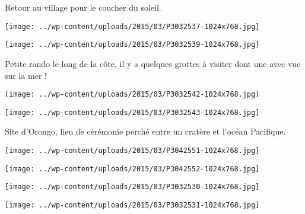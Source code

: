 Retour au village pour le coucher du soleil.
\begin{center} \texttt{[image: ../wp-content/uploads/2015/03/P3032537-1024x768.jpg]} \end{center}
\begin{center} \texttt{[image: ../wp-content/uploads/2015/03/P3032539-1024x768.jpg]} \end{center}

 Petite rando le long de la côte, il y a quelques grottes à visiter dont une avec vue sur la mer !
\begin{center} \texttt{[image: ../wp-content/uploads/2015/03/P3032542-1024x768.jpg]} \end{center}
\begin{center} \texttt{[image: ../wp-content/uploads/2015/03/P3032543-1024x768.jpg]} \end{center}

 Site d'Orongo, lieu de cérémonie perché entre un cratère et l'océan Pacifique.
\begin{center} \texttt{[image: ../wp-content/uploads/2015/03/P3042551-1024x768.jpg]} \end{center}
\begin{center} \texttt{[image: ../wp-content/uploads/2015/03/P3042552-1024x768.jpg]} \end{center}
\begin{center} \texttt{[image: ../wp-content/uploads/2015/03/P3032530-1024x768.jpg]} \end{center}
\begin{center} \texttt{[image: ../wp-content/uploads/2015/03/P3032531-1024x768.jpg]} \end{center}
